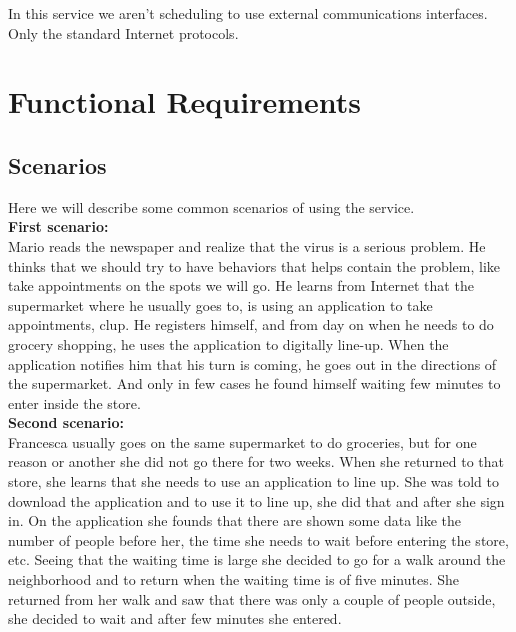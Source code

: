 In this service we aren't scheduling to use external communications interfaces.
Only the standard Internet protocols.


\section{Functional Requirements}

\subsection{Scenarios}

Here we will describe some common scenarios of using the service.\\

\textbf{First scenario:}\\
Mario reads the newspaper and realize that the virus is a serious problem. He thinks that we should try to have behaviors that helps contain the problem, like take appointments on the spots we will go. He learns from Internet that the supermarket where he usually goes to, is using an application to take appointments, \gls{clup}. He registers himself, and from day on when he needs to do grocery shopping, he uses the application to digitally line-up. When the application notifies him that his turn is coming, he goes out in the directions of the supermarket. And only in few cases he found himself waiting few minutes to enter inside the store.\\

\textbf{Second scenario:}\\
Francesca usually goes on the same supermarket to do groceries, but for one reason or another she did not go there for two weeks. When she returned to that store, she learns that she needs to use an application to line up. She was told to download the application and to use it to line up, she did that and after she sign in.
On the application she founds that there are shown some data like the number of people before her, the time she needs to wait before entering the store, etc.
Seeing that the waiting time is large she decided to go for a walk around the neighborhood and to return when the waiting time is of five minutes. She returned from her walk and saw that there was only a couple of people outside, she decided to wait and after few minutes she entered.\\

